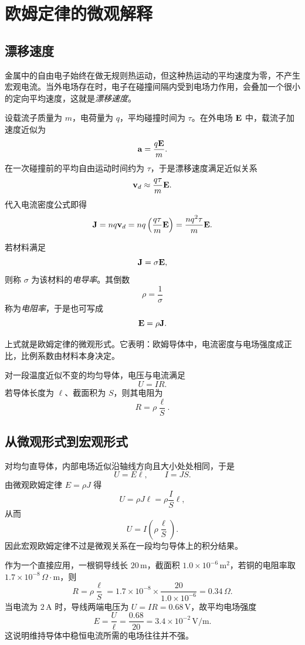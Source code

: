 \section{欧姆定律的微观解释}

\subsection{漂移速度}

金属中的自由电子始终在做无规则热运动，但这种热运动的平均速度为零，不产生宏观电流。当外电场存在时，电子在碰撞间隔内受到电场力作用，会叠加一个很小的定向平均速度，这就是\emph{漂移速度}。

设载流子质量为 $m$，电荷量为 $q$，平均碰撞时间为 $\tau$。在外电场 $\vb{E}$ 中，载流子加速度近似为
\[
\vb{a}=\frac{q\vb{E}}{m}.
\]
在一次碰撞前的平均自由运动时间约为 $\tau$，于是漂移速度满足近似关系
\[
\vb{v}_d\approx \frac{q\tau}{m}\vb{E}.
\]
代入电流密度公式即得
\[
\vb{J}=nq\vb{v}_d=nq\left(\frac{q\tau}{m}\vb{E}\right)
=\frac{nq^2\tau}{m}\vb{E}.
\]

\begin{definition}
若材料满足
\[
\vb{J}=\sigma \vb{E},
\]
则称 $\sigma$ 为该材料的\emph{电导率}。其倒数
\[
\rho=\frac{1}{\sigma}
\]
称为\emph{电阻率}，于是也可写成
\[
\vb{E}=\rho\vb{J}.
\]
\end{definition}

上式就是欧姆定律的微观形式。它表明：欧姆导体中，电流密度与电场强度成正比，比例系数由材料本身决定。

\begin{law}[欧姆定律]
对一段温度近似不变的均匀导体，电压与电流满足
\[
U=IR.
\]
若导体长度为 $\ell$、截面积为 $S$，则其电阻为
\[
R=\rho\frac{\ell}{S}.
\]
\end{law}

\subsection{从微观形式到宏观形式}

对均匀直导体，内部电场近似沿轴线方向且大小处处相同，于是
\[
U=E\ell,
\qquad
I=JS.
\]
由微观欧姆定律 $E=\rho J$ 得
\[
U=\rho J\ell=\rho\frac{I}{S}\ell,
\]
从而
\[
U=I\left(\rho\frac{\ell}{S}\right).
\]
因此宏观欧姆定律不过是微观关系在一段均匀导体上的积分结果。

作为一个直接应用，一根铜导线长 $20\,\text{m}$，截面积 $1.0\times 10^{-6}\,\text{m}^2$，若铜的电阻率取 $1.7\times 10^{-8}\,\Omega\cdot\text{m}$，则
\[
R=\rho\frac{\ell}{S}=1.7\times 10^{-8}\times\frac{20}{1.0\times 10^{-6}}=0.34\,\Omega.
\]
当电流为 $2\,\text{A}$ 时，导线两端电压为 $U=IR=0.68\,\text{V}$，故平均电场强度
\[
E=\frac{U}{\ell}=\frac{0.68}{20}=3.4\times 10^{-2}\,\text{V/m}.
\]
这说明维持导体中稳恒电流所需的电场往往并不强。

